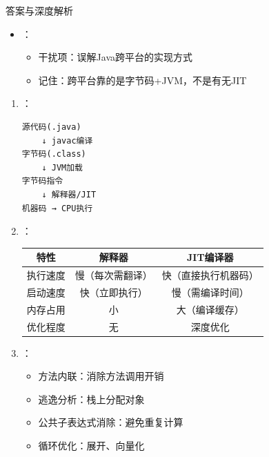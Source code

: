 \documentclass[12pt, a4paper]{ctexart}
\begin{document}
\begin{enumerate}[label=\textbf{\arabic*.}]
\begin{bluebox}{答案与深度解析}
\begin{itemize}[leftmargin=*, nosep]
			      \item {}：
			            \begin{itemize}
				            \item 干扰项：误解Java跨平台的实现方式
				            \item 记住：跨平台靠的是字节码+JVM，不是有无JIT
			            \end{itemize}
		      \end{itemize}

		      \begin{enumerate}[leftmargin=*, nosep]
			      \item {}：
			            \begin{verbatim}
源代码(.java) 
    ↓ javac编译
字节码(.class)
    ↓ JVM加载
字节码指令
    ↓ 解释器/JIT
机器码 → CPU执行
    \end{verbatim}

			      \item {}：
			            \begin{tabular}{|c|c|c|}
				            \hline
				            \textbf{特性} & \textbf{解释器} & \textbf{JIT编译器} \\
				            \hline
				            执行速度        & 慢（每次需翻译）     & 快（直接执行机器码）      \\
				            \hline
				            启动速度        & 快（立即执行）      & 慢（需编译时间）        \\
				            \hline
				            内存占用        & 小            & 大（编译缓存）         \\
				            \hline
				            优化程度        & 无            & 深度优化            \\
				            \hline
			            \end{tabular}

			      \item {}：
			            \begin{itemize}
				            \item 方法内联：消除方法调用开销
				            \item 逃逸分析：栈上分配对象
				            \item 公共子表达式消除：避免重复计算
				            \item 循环优化：展开、向量化
			            \end{itemize}


\end{enumerate}
\end{bluebox}
\end{enumerate}
\end{document}
